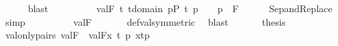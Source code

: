 \begin{isabellebody}
\ \ \ \ \isamarkupfalse%
\ blast\isanewline
\ \ \isamarkupfalse%
\isanewline
\ \ \isamarkupfalse%
\ {\isachardoublequoteopen}\ {\isachardot}{\kern0pt}{\isachardot}{\kern0pt}{\isachardot}{\kern0pt}\ {\isacharequal}{\kern0pt}\ {\isacharbraceleft}{\kern0pt}val{\isacharparenleft}{\kern0pt}F{\isacharcomma}{\kern0pt}\ t{\isacharparenright}{\kern0pt}{\isachardot}{\kern0pt}{\isachardot}{\kern0pt}\ t{\isasymin}domain{\isacharparenleft}{\kern0pt}{\isasymtau}{\isacharparenright}{\kern0pt}{\isacharcomma}{\kern0pt}\ {\isasymexists}p{\isasymin}P{\isachardot}{\kern0pt}\ {\isasymlangle}t{\isacharcomma}{\kern0pt}\ p{\isasymrangle}\ {\isasymin}\ {\isasymtau}\ {\isasymand}\ p\ {\isasymin}\ F{\isacharbraceright}{\kern0pt}{\isachardoublequoteclose}\isanewline
\ \ \ \ \isamarkupfalse%
\ Sep{\isacharunderscore}{\kern0pt}and{\isacharunderscore}{\kern0pt}Replace\ \isamarkupfalse%
\ simp\isanewline
\ \ \isamarkupfalse%
\isanewline
\ \ \isamarkupfalse%
\ {\isachardoublequoteopen}\ {\isachardot}{\kern0pt}{\isachardot}{\kern0pt}{\isachardot}{\kern0pt}\ {\isacharequal}{\kern0pt}\ val{\isacharparenleft}{\kern0pt}F{\isacharcomma}{\kern0pt}\ {\isasymtau}{\isacharparenright}{\kern0pt}{\isachardoublequoteclose}\isanewline
\ \ \ \ \isamarkupfalse%
\ def{\isacharunderscore}{\kern0pt}val{\isacharbrackleft}{\kern0pt}symmetric{\isacharbrackright}{\kern0pt}\ \isamarkupfalse%
\ blast\isanewline
\ \ \isamarkupfalse%
\isanewline
\ \ \isamarkupfalse%
\ {\isacharquery}{\kern0pt}thesis\ \isacommand{{\isachardot}{\kern0pt}{\isachardot}{\kern0pt}}\isamarkupfalse%
\isanewline
{}\isamarkupfalse%
%
\endisatagproof
{\isafoldproof}%
%
\isadelimproof
\isanewline
%
\endisadelimproof
\isanewline
{}\isamarkupfalse%
\ val{\isacharunderscore}{\kern0pt}only{\isacharunderscore}{\kern0pt}pairs{\isacharcolon}{\kern0pt}\ {\isachardoublequoteopen}val{\isacharparenleft}{\kern0pt}F{\isacharcomma}{\kern0pt}{\isasymtau}{\isacharparenright}{\kern0pt}\ {\isacharequal}{\kern0pt}\ val{\isacharparenleft}{\kern0pt}F{\isacharcomma}{\kern0pt}{\isacharbraceleft}{\kern0pt}x{\isasymin}{\isasymtau}{\isachardot}{\kern0pt}\ {\isasymexists}t\ p{\isachardot}{\kern0pt}\ x{\isacharequal}{\kern0pt}{\isasymlangle}t{\isacharcomma}{\kern0pt}p{\isasymrangle}{\isacharbraceright}{\kern0pt}{\isacharparenright}{\kern0pt}{\isachardoublequoteclose}\isanewline
%
\isadelimproof
%
\endisadelimproof
%
\isatagproof
{}\isamarkupfalse%

\end{isabellebody}

